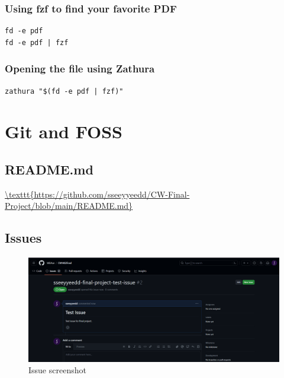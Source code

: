 \documentclass[titlepage]{article}
\begin{document}
\subsubsection{Using fzf to find your favorite PDF}
\begin{verbatim}
fd -e pdf
fd -e pdf | fzf
\end{verbatim}
\subsubsection{Opening the file using Zathura}
\begin{verbatim}
zathura "$(fd -e pdf | fzf)"
\end{verbatim}
\newpage
\section{Git and FOSS}
\subsection{README.md}
\url{\texttt{https://github.com/sseeyyeedd/CW-Final-Project/blob/main/README.md}}
\subsection{Issues}
\begin{figure}[ht]
    \centering
    \includegraphics[width=1\textwidth]{s.png}
    \caption{Issue screenshot}
\end{figure}
\end{document}
